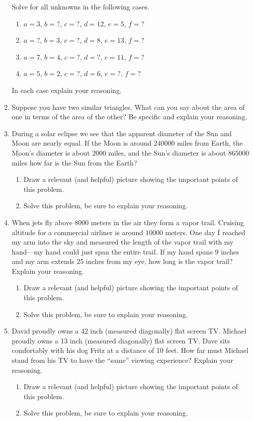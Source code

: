 \begin{problems}
\begin{enumerate}
\[\]
Solve for all unknowns in the following cases.
\begin{enumerate}
\item $a = 3$, $b = ?$, $c = ?$, $d = 12$, $e = 5$, $f = ?$
\item $a = ?$, $b = 3$, $c = ?$, $d =8$, $e = 13$, $f = ?$
\item $a = 7$, $b = 4$, $c = ?$, $d =?$, $e = 11$, $f = ?$
\item $a = 5$, $b = 2$, $c = ?$, $d =6$, $e = ?$, $f = ?$
\end{enumerate}
In each case explain your reasoning.

\item Suppose you have two similar triangles. What can you say about
  the area of one in terms of the area of the other? Be specific and
  explain your reasoning.

\item During a solar eclipse we see that the apparent diameter of the
  Sun and Moon are nearly equal. If the Moon is around $240000$ miles
  from Earth, the Moon's diameter is about $2000$ miles, and the Sun's
  diameter is about $865000$ miles how far is the Sun from the Earth?
\begin{enumerate}
\item Draw a relevant (and helpful) picture showing the important
  points of this problem.
\item Solve this problem, be sure to explain your reasoning.
\end{enumerate}


\item When jets fly above $8000$ meters in the air they form a vapor
  trail. Cruising altitude for a commercial airliner is around $10000$
  meters. One day I reached my arm into the sky and measured the
  length of the vapor trail with my hand---my hand could just span the
  entire trail. If my hand spans $9$ inches and my arm extends $25$
  inches from my eye, how long is the vapor trail? Explain your
  reasoning.
\begin{enumerate}
\item Draw a relevant (and helpful) picture showing the important
  points of this problem.
\item Solve this problem, be sure to explain your reasoning.
\end{enumerate}

\item David proudly owns a 42 inch (measured diagonally) flat screen
  TV. Michael proudly owns a 13 inch (measured diagonally) flat screen
  TV. Dave sits comfortably with his dog Fritz at a distance of 10
  feet. How far must Michael stand from his TV to have the ``same''
  viewing experience?  Explain your reasoning.
\begin{enumerate}
\item Draw a relevant (and helpful) picture showing the important
  points of this problem.
\item Solve this problem, be sure to explain your reasoning.
\end{enumerate}


\end{enumerate}
\end{problems}
